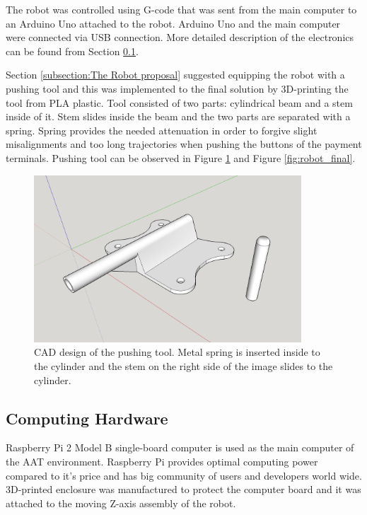 The robot was controlled using G-code that was sent from the main computer to an Arduino Uno attached to the robot. Arduino Uno and the main computer were connected via USB connection. More detailed description of the electronics can be found from Section \ref{subsection:Computing hardware}.

Section \ref{subsection:The Robot proposal} suggested equipping the robot with a pushing tool and this was implemented to the final solution by 3D-printing the tool from PLA plastic. Tool consisted of two parts: cylindrical beam and a stem inside of it. Stem slides inside the beam and the two parts are separated with a spring. Spring provides the needed attenuation in order to forgive slight misalignments and too long trajectories when pushing the buttons of the payment terminals. Pushing tool can be observed in Figure \ref{fig:pushing_tool} and Figure \ref{fig:robot_final}.

\begin{figure}[ht]
  \begin{center}
    \includegraphics[width=10cm]{images/pushing_tool.png}
    \caption{CAD design of the pushing tool. Metal spring is inserted inside to the cylinder and the stem on the right side of the image slides to the cylinder.}
    \label{fig:pushing_tool}
  \end{center}
\end{figure}
\FloatBarrier

\subsection{Computing Hardware}
\label{subsection:Computing hardware}

Raspberry Pi 2 Model B single-board computer is used as the main computer of the AAT environment. Raspberry Pi provides optimal computing power compared to it's price and has big community of users and developers world wide. 3D-printed enclosure was manufactured to protect the computer board and it was attached to the moving Z-axis assembly of the robot.

